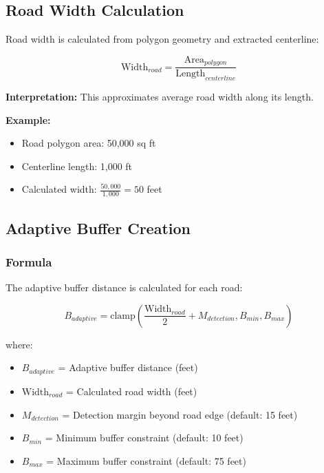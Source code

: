 \documentclass[11pt,letterpaper]{article}
\begin{document}
\subsection{Road Width Calculation}

Road width is calculated from polygon geometry and extracted centerline:

\begin{equation}
\text{Width}_{road} = \frac{\text{Area}_{polygon}}{\text{Length}_{centerline}}
\end{equation}

\textbf{Interpretation:} This approximates average road width along its length.

\textbf{Example:}
\begin{itemize}
    \item Road polygon area: 50,000 sq ft
    \item Centerline length: 1,000 ft
    \item Calculated width: $\frac{50,000}{1,000} = 50$ feet
\end{itemize}

\subsection{Adaptive Buffer Creation}

\subsubsection{Formula}

The adaptive buffer distance is calculated for each road:

\begin{equation}
B_{adaptive} = \text{clamp}\left(\frac{\text{Width}_{road}}{2} + M_{detection}, B_{min}, B_{max}\right)
\end{equation}

where:
\begin{itemize}
    \item $B_{adaptive}$ = Adaptive buffer distance (feet)
    \item $\text{Width}_{road}$ = Calculated road width (feet)
    \item $M_{detection}$ = Detection margin beyond road edge (default: 15 feet)
    \item $B_{min}$ = Minimum buffer constraint (default: 10 feet)
    \item $B_{max}$ = Maximum buffer constraint (default: 75 feet)
\end{itemize}
\end{document}
